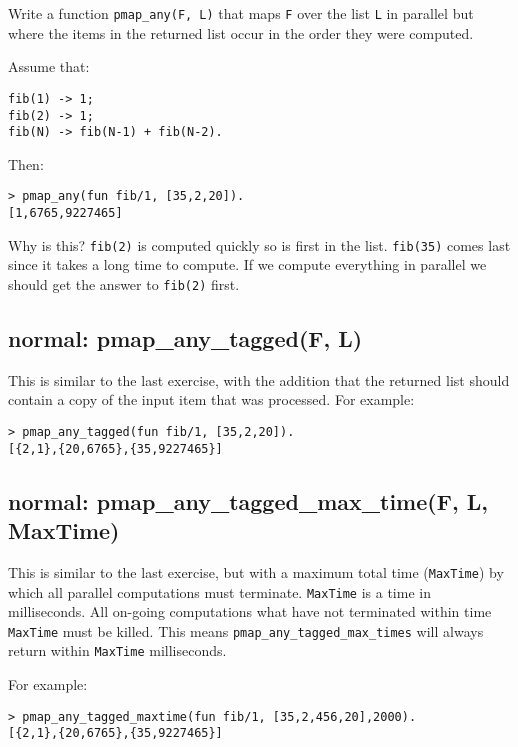 \documentclass[12pt]{hitec}
\begin{document}
Write a function \verb+pmap_any(F, L)+ that maps \verb+F+ over the
list \verb+L+ in parallel but where the items in the returned list
occur in the order they were computed.

Assume that:

\begin{Verbatim}
fib(1) -> 1;
fib(2) -> 1; 
fib(N) -> fib(N-1) + fib(N-2).
\end{Verbatim}

Then:

\begin{Verbatim}
> pmap_any(fun fib/1, [35,2,20]).
[1,6765,9227465]
\end{Verbatim}

Why is this? \verb+fib(2)+ is computed quickly so is first in the
list.  \verb+fib(35)+ comes last since it takes a long time to
compute. If we compute everything in parallel we should get the answer
to \verb+fib(2)+ first.

\subsection{normal: pmap\_any\_tagged(F, L)}

This is similar to the last exercise, with the addition that the returned
list should contain a copy of the input item that was processed. For example:

\begin{Verbatim}
> pmap_any_tagged(fun fib/1, [35,2,20]).
[{2,1},{20,6765},{35,9227465}]
\end{Verbatim}

\subsection{normal: pmap\_any\_tagged\_max\_time(F, L, MaxTime)}

This is similar to the last exercise, but with a maximum total time
(\verb+MaxTime+) by which all parallel computations must
terminate. \verb+MaxTime+ is a time in milliseconds.  All on-going
computations what have not terminated within time \verb+MaxTime+ must
be killed. This means \verb+pmap_any_tagged_max_times+ will always
return within \verb+MaxTime+ milliseconds.

For example:

\begin{Verbatim}
> pmap_any_tagged_maxtime(fun fib/1, [35,2,456,20],2000).
[{2,1},{20,6765},{35,9227465}]
\end{Verbatim}
\end{document}
